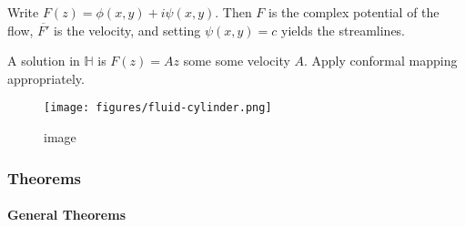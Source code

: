 Write \(F(z) = \phi(x,y) + i\psi(x,y)\). Then \(F\) is the complex
potential of the flow, \(\overline{F'}\) is the velocity, and setting
\(\psi(x,y) = c\) yields the streamlines.

A solution in \(\mathbb{H}\) is \(F(z) = Az\) some some velocity \(A\).
Apply conformal mapping appropriately.

\begin{figure}
\centering
\texttt{[image: figures/fluid-cylinder.png]}
\caption{image}
\end{figure}

\hypertarget{theorems}{%
\subsubsection{Theorems}\label{theorems}}

\hypertarget{general-theorems}{%
\paragraph{General Theorems}\label{general-theorems}}

